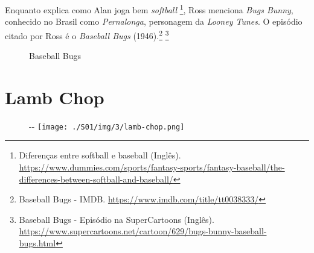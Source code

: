 \saveparinfos
\noindent
\begin{minipage}[c]{0.5\textwidth}\useparinfo

Enquanto explica como Alan joga bem \emph{softball} \footnote{\sloppy Diferenças entre softball e baseball (Inglês). \url{https://www.dummies.com/sports/fantasy-sports/fantasy-baseball/the-differences-between-softball-and-baseball/}},
Ross menciona \emph{Bugs Bunny}, conhecido no Brasil como
\emph{Pernalonga}, personagem da \emph{Looney Tunes}. O episódio citado
por Ross é o \emph{Baseball Bugs} (1946).\footnote{\sloppy Baseball Bugs - IMDB. \url{https://www.imdb.com/title/tt0038333/}}
\footnote{\sloppy Baseball Bugs - Episódio na SuperCartoons (Inglês). \url{https://www.supercartoons.net/cartoon/629/bugs-bunny-baseball-bugs.html}}

\end{minipage}\hfill
\begin{minipage}[c]{0.5\textwidth}

\begin{figure}
  \centering
    \caption{Baseball Bugs\label{fig:baseball-bugs}}
\end{figure}

\end{minipage}

\hypertarget{lamb-chop}{%
\section{Lamb Chop}\label{lamb-chop}}

\begin{figure}[!ht]
  \begin{adjustwidth}{-\oddsidemargin-1in}{-\rightmargin}
    \centering
    \texttt{[image: ./S01/img/3/lamb-chop.png]}
  \end{adjustwidth}
\end{figure}

